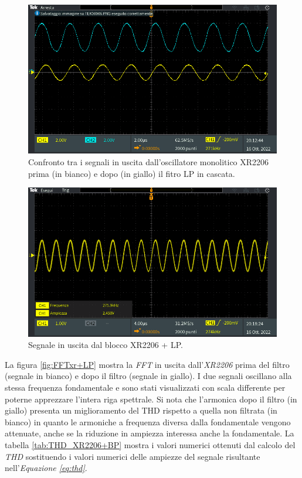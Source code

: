 \documentclass[titlepage]{report}
\begin{document}
	\begin{figure}[H]
		\centering
		\includegraphics[scale=0.5]{Immagini/sin_xr+lp.PNG}
		\caption{Confronto tra i segnali in uscita dall'oscillatore monolitico XR2206 prima (in bianco) e dopo (in giallo) il fitro LP in cascata.}
		\label{fig:SINxr+LP}
	\end{figure}


	\begin{figure}[H]
		\centering
		\includegraphics[scale=0.5]{Immagini/sin_xr.PNG}
		\caption{Segnale in uscita dal blocco XR2206 + LP.}
		\label{fig:SINx}
	\end{figure}

	La figura \ref{fig:FFTxr+LP} mostra la \textit{FFT} in uscita dall'\textit{XR2206} prima del filtro (segnale in bianco) e dopo il filtro (segnale in giallo). I due segnali oscillano alla stessa frequenza fondamentale e sono stati visualizzati con scala differente per poterne apprezzare l'intera riga spettrale. Si nota che l'armonica dopo il filtro (in giallo) presenta un miglioramento del THD rispetto a quella non filtrata (in bianco) in quanto le armoniche a frequenza diversa dalla fondamentale vengono attenuate, anche se la riduzione in ampiezza interessa anche la fondamentale. La tabella \ref{tab:THD_XR2206+BP} mostra i valori numerici ottenuti dal calcolo del \textit{THD} sostituendo i valori numerici delle ampiezze del segnale risultante nell'\textit{Equazione \ref{eq:thd}}.
\end{document}
